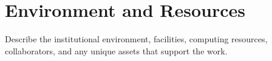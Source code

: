 \section{Environment and Resources}

Describe the institutional environment, facilities, computing
resources, collaborators, and any unique assets that support the work.
